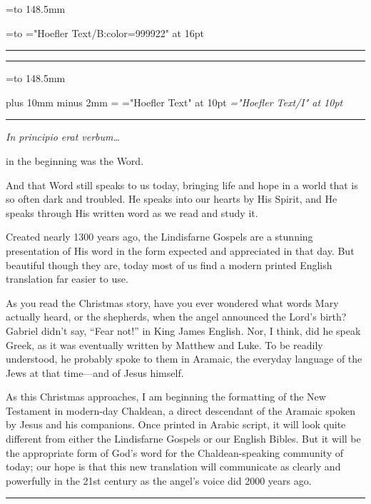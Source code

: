 \hoffset -27mm
\voffset -27mm
\nopagenumbers
\frenchspacing

\def\green{999922}
\newbox\front
\setbox\front=\vbox to 148.5mm
{\hsize=105mm
 =\hbox to 
 \font\txt="Hoefler Text/B:color=\green" at 16pt \txt
 \hrule height 0pt
 \vss
 \bigskip
 \bigskip
 \vss
 \hrule height 0pt
}

\newbox\text
\setbox\text=\vbox to 148.5mm
{\hsize=105mm
 \parindent=0pt
 \leftskip=10mm \rightskip=10mm plus 10mm minus 2mm
 \parskip=\medskipamount
 \font\txt="Hoefler Text" at 10pt \txt
 \font\it="Hoefler Text/I" at 10pt
 \baselineskip=12.5pt
 \hrule height 0pt
 \bigskip
 \bigskip
 {\special{x:textcolor=\green}\it In principio erat verbum…}
 in the beginning was the Word.\break
 And that Word still speaks to us today, bringing life and hope
 in a world that is so often dark and troubled.
 He speaks into our hearts by His Spirit,
 and He speaks through His written word as we read and study it.
 
 Created nearly 1300 years ago, the Lindisfarne Gospels are
 a stunning presentation of His word in the form expected and
 appreciated in that day. But beautiful though they are,
 today most of us find a modern printed English
 translation far easier to use.
 
 As you read the Christmas story,
 have you ever wondered what words Mary actually heard,
 or the shepherds, when the angel announced the Lord’s birth?
 Gabriel didn’t say, “Fear not!” in King James English.
 Nor, I think, did he speak Greek, as it was eventually written by Matthew and Luke.
 To be readily understood, he probably spoke to them in Aramaic,
 the everyday language of the Jews at that time—and of Jesus himself.
 
 As this Christmas approaches, I am beginning the formatting of
 the New Testament in modern-day Chaldean,
 a direct descendant of the Aramaic spoken
 by Jesus and his companions.
 Once printed in Arabic script, it will look quite different from either
 the Lindisfarne Gospels or our English Bibles.
 But it will be the appropriate form of God’s word
 for the Chaldean-speaking community of today;
 our hope is that this new translation will
 communicate as clearly and powerfully in the 21st century
 as the angel’s voice did 2000 years ago.
 \vfill
 \hrule height 0pt
}

